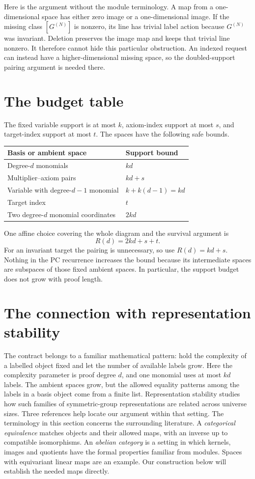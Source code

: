 \documentclass[11pt,a4paper,oneside,openany]{book}
\theoremstyle{definition}\newtheorem{definition}[theorem]{Definition}
\theoremstyle{remark}\newtheorem{remark}[theorem]{Remark}
\numberwithin{equation}{chapter}
\begin{document}
Here is the argument without the module terminology. A map from a
one-dimensional space has either zero image or a one-dimensional
image. If the missing class $[G^{(N)}]$ is nonzero, its line has trivial
label action because $G^{(N)}$ was invariant. Deletion preserves the
image map and keeps that trivial line nonzero. It therefore cannot
hide this particular obstruction. An indexed request can instead
have a higher-dimensional missing space, so the doubled-support
pairing argument is needed there.

\section{The budget table}
The fixed variable support is at most $k$, axiom-index support at most
$s$, and target-index support at most $t$. The spaces have the following
safe bounds.
\begin{center}
\begin{tabular}{@{}ll@{}}
\toprule
Basis or ambient space & Support bound\\
\midrule
Degree-$d$ monomials & $kd$\\
Multiplier--axiom pairs & $kd+s$\\
Variable with degree-$d-1$ monomial & $k+k(d-1)=kd$\\
Target index & $t$\\
Two degree-$d$ monomial coordinates & $2kd$\\
\bottomrule
\end{tabular}
\end{center}
One affine choice covering the whole diagram and the survival argument is
\[
                           R(d)=2kd+s+t.
\]
For an invariant target the pairing is unnecessary, so use $R(d)=kd+s$.
Nothing in the PC recurrence increases the bound because its intermediate
spaces are subspaces of those fixed ambient spaces. In particular, the
support budget does not grow with proof length.

\section{The connection with representation stability}\label{tx:sec:stability-context}
The contract belongs to a familiar mathematical pattern: hold the
complexity of a labelled object fixed and let the number of available
labels grow. Here the complexity parameter is proof degree $d$, and
one monomial uses at most $kd$ labels. The ambient spaces grow, but
the allowed equality patterns among the labels in a basis object
come from a finite list. Representation stability studies how such
families of symmetric-group representations are related across universe sizes.
Three references help locate our argument within that setting.
The terminology in this section concerns the surrounding literature.
A \emph{categorical equivalence} matches objects and their allowed
maps, with an inverse up to compatible isomorphisms. An
\emph{abelian category} is a setting in which kernels, images and
quotients have the formal properties familiar from modules.
Spaces with equivariant linear maps are an example. Our construction
below will establish the needed maps directly.
\end{document}
